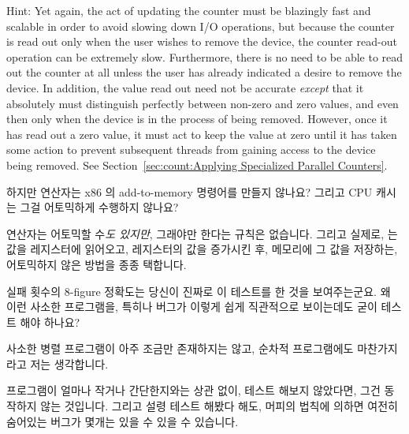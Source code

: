 \begin{enumerate}
	Hint: Yet again, the act of updating the counter must be blazingly
	fast and scalable in order to avoid slowing down I/O operations,
	but because the counter is read out only when the
	user wishes to remove the device, the counter read-out
	operation can be extremely slow.
	Furthermore, there is no need to be able to read out
	the counter at all unless the user has already indicated
	a desire to remove the device.
	In addition, the value read out need not be accurate
	\emph{except} that it absolutely must distinguish perfectly
	between non-zero and zero values, and even then only when
	the device is in the process of being removed.
	However, once it has read out a zero value, it must act
	to keep the value at zero until it has taken some action
	to prevent subsequent threads from gaining access to the
	device being removed.
	See Section~\ref{sec:count:Applying Specialized Parallel Counters}.
	\fi

\QuickQ{}
	하지만 \co{++} 연산자는 x86 의 add-to-memory 명령어를 만들지 않나요?
	그리고 CPU 캐시는 그걸 어토믹하게 수행하지 않나요?

\QuickA{}
	\co{++} 연산자는 어토믹할 수\emph{도 있지만}, 그래야만 한다는 규칙은
	없습니다.
	그리고 실제로,  는 값을 레지스터에 읽어오고, 레지스터의 값을
	증가시킨 후, 메모리에 그 값을 저장하는, 어토믹하지 않은 방법을 종종
	택합니다.

\QuickQ{}
	실패 횟수의 8-figure 정확도는 당신이 진짜로 이 테스트를 한 것을
	보여주는군요.
	왜 이런 사소한 프로그램을, 특히나 버그가 이렇게 쉽게 직관적으로
	보이는데도 굳이 테스트 해야 하나요?

\QuickA{}
	사소한 병렬 프로그램이 아주 조금만 존재하지는 않고, 순차적 프로그램에도
	마찬가지라고 저는 생각합니다.

	프로그램이 얼마나 작거나 간단한지와는 상관 없이, 테스트 해보지
	않았다면, 그건 동작하지 않는 것입니다.
	그리고 설령 테스트 해봤다 해도, 머피의 법칙에 의하면 여전히 숨어있는
	버그가 몇개는 있을 수 있을 수 있습니다.
	\iffalse


\end{enumerate}
